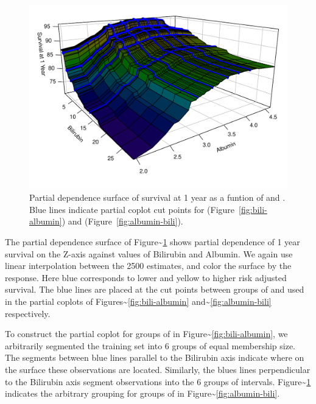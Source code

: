 \documentclass[article]{jss}
\begin{document}
\begin{Schunk}
\begin{figure}[!htb]

{\centering \includegraphics{fig-rfs/rfs-surface3d-1} 

}

\caption{Partial dependence surface of survival at 1 year as a funtion of  and . Blue lines indicate partial coplot cut points for  (Figure~\ref{fig:bili-albumin}) and  (Figure~\ref{fig:albumin-bili}).}\label{fig:surface3d}
\end{figure}
\end{Schunk}

The partial dependence surface of
Figure\textasciitilde{}\ref{fig:surface3d} shows partial dependence of 1
year survival on the Z-axis against values of Bilirubin and Albumin. We
again use linear interpolation between the 2500 estimates, and color the
surface by the response. Here blue corresponds to lower and yellow to
higher risk adjusted survival. The blue lines are placed at the cut
points between groups of  and  used in the
partial coplots of Figures\textasciitilde{}\ref{fig:bili-albumin}
and\textasciitilde{}\ref{fig:albumin-bili} respectively.

To construct the partial coplot for groups of  in
Figure\textasciitilde{}\ref{fig:bili-albumin}, we arbitrarily segmented
the training set into 6 groups of equal membership size. The segments
between blue lines parallel to the Bilirubin axis indicate where on the
surface these observations are located. Similarly, the blues lines
perpendicular to the Bilirubin axis segment observations into the 6
groups of  intervals.
Figure\textasciitilde{}\ref{fig:surface3d} indicates the arbitrary
grouping for groups of  in
Figure\textasciitilde{}\ref{fig:albumin-bili}.
\end{document}
